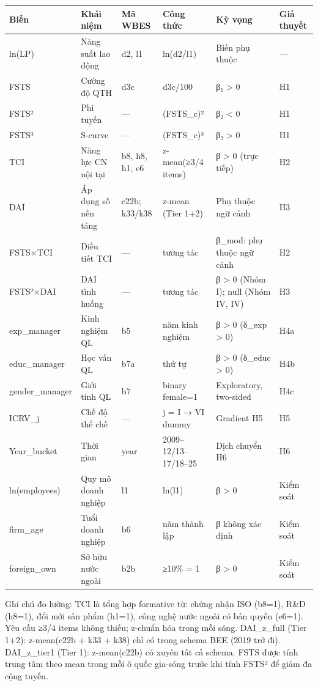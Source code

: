 \documentclass[12pt,a4paper]{article}
\begin{document}
\begin{longtable}[]{@{}llllll@{}}
\toprule\noalign{}
Biến & Khái niệm & Mã WBES & Công thức & Kỳ vọng & Giả thuyết \\
\midrule\noalign{}
\endhead
\bottomrule\noalign{}
\endlastfoot
ln(LP) & Năng suất lao động & d2, l1 & ln(d2/l1) & Biến phụ thuộc &
--- \\
FSTS & Cường độ QTH & d3c & d3c/100 & β₁ \textgreater{} 0 & H1 \\
FSTS² & Phi tuyến & --- & (FSTS\_c)² & β₂ \textless{} 0 & H1 \\
FSTS³ & S-curve & --- & (FSTS\_c)³ & β₃ \textgreater{} 0 & H1 \\
TCI & Năng lực CN nội tại & b8, h8, h1, e6 & z-mean(≥3/4 items) & β
\textgreater{} 0 (trực tiếp) & H2 \\
DAI & Áp dụng số nền tảng & c22b; k33/k38 & z-mean (Tier 1+2) & Phụ
thuộc ngữ cảnh & H3 \\
FSTS×TCI & Điều tiết TCI & --- & tương tác & β\_mod: phụ thuộc ngữ cảnh
& H2 \\
FSTS²×DAI & DAI tình huống & --- & tương tác & β \textgreater{} 0 (Nhóm
I); null (Nhóm IV, IV) & H3 \\
exp\_manager & Kinh nghiệm QL & b5 & năm kinh nghiệm & β \textgreater{}
0 (δ\_exp \textgreater{} 0) & H4a \\
educ\_manager & Học vấn QL & b7a & thứ tự & β \textgreater{} 0 (δ\_educ
\textgreater{} 0) & H4b \\
gender\_manager & Giới tính QL & b7 & binary female=1 & Exploratory,
two-sided & H4c \\
ICRV\_j & Chế độ thể chế & --- & j = I → VI dummy & Gradient H5 & H5 \\
Year\_bucket & Thời gian & year & 2009--12/13--17/18--25 & Dịch chuyển
H6 & H6 \\
ln(employees) & Quy mô doanh nghiệp & l1 & ln(l1) & β \textgreater{} 0 &
Kiểm soát \\
firm\_age & Tuổi doanh nghiệp & b6 & năm thành lập & β không xác định &
Kiểm soát \\
foreign\_own & Sở hữu nước ngoài & b2b & ≥10\% = 1 & β \textgreater{} 0
& Kiểm soát \\
\end{longtable}

Ghi chú đo lường: TCI là tổng hợp formative từ: chứng nhận ISO (b8=1),
R\&D (h8=1), đổi mới sản phẩm (h1=1), công nghệ nước ngoài có bản quyền
(e6=1). Yêu cầu ≥3/4 items không thiếu; z-chuẩn hóa trong mỗi sóng.
DAI\_z\_full (Tier 1+2): z-mean(c22b + k33 + k38) chỉ có trong schema
BEE (2019 trở đi). DAI\_z\_tier1 (Tier 1): z-mean(c22b) có xuyên tất cả
schema. FSTS được tính trung tâm theo mean trong mỗi ô quốc gia-sóng
trước khi tính FSTS² để giảm đa cộng tuyến.
\end{document}
